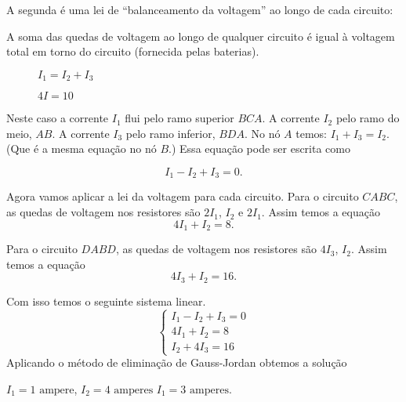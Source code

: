 A segunda é uma lei de ``balanceamento da voltagem'' ao longo de cada circuito:

\begin{definicao}
    A soma das quedas de voltagem ao longo de qualquer circuito  é igual à voltagem total em torno do circuito (fornecida pelas baterias).
\end{definicao}

\begin{figure}[!h]
    \centering
    
    \caption{$I_1 = I_2 + I_3$}
\end{figure}

\begin{figure}[!h]
    \centering
    
    \caption{$4I = 10$}
\end{figure}

\begin{figure}[!h]
    \centering
    
\end{figure}

Neste caso a corrente $I_1$ flui pelo ramo superior $BCA$. A corrente $I_2$ pelo ramo do meio, $AB$. A corrente $I_3$ pelo ramo inferior, $BDA$. No nó $A$ temos: $I_1 + I_3 = I_2$. (Que é a mesma equação no nó $B$.)  Essa equação pode ser escrita como

\[
    I_1 - I_2 + I_3 = 0.
\]


Agora vamos aplicar a lei da voltagem para cada circuito. Para o circuito $CABC$, as quedas de voltagem nos resistores são $2I_1$, $I_2$ e $2I_1$. Assim temos a equação
\[
    4I_1 + I_2 = 8.
\]

Para o circuito $DABD$, as quedas de voltagem nos resistores são $4I_3$, $I_2$. Assim temos a equação
\[
    4I_3 + I_2 = 16.
\]

Com isso temos o seguinte sistema linear.
\[
    \begin{cases}
        I_1 - I_2 + I_3 = 0\\
        4I_1 + I_2 = 8\\
        I_2 + 4I_3 = 16
    \end{cases}
\]
Aplicando o método de eliminação de Gauss-Jordan obtemos a solução
\begin{center}
    $I_1 = 1 \mbox{ ampere}$, $I_2 = 4 \mbox{ amperes}$ $I_1 = 3 \mbox{ amperes}$.
\end{center}

\begin{figure}[!h]
    \centering
    
\end{figure}

